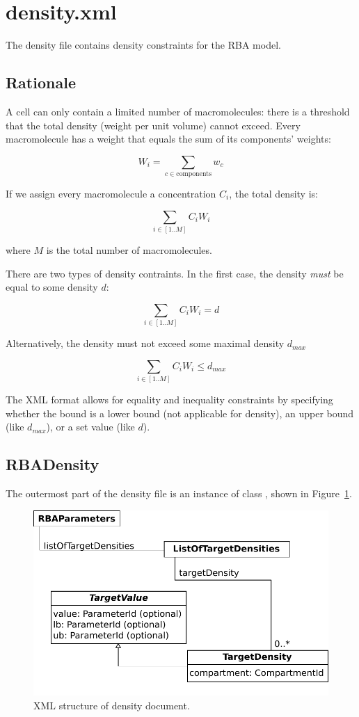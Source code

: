 
\section{density.xml}

The density file contains density constraints for the RBA model.

\subsection{Rationale}

A cell can only contain a limited number of macromolecules:
there is a threshold that the total density
(weight per unit volume) cannot exceed.
Every macromolecule has a weight that equals the sum of its components' weights:

\[
  W_i = \sum_{c \in \mathrm{components}} w_c
\]

If we assign every macromolecule a concentration $C_i$, the total density is:

\[
  \sum_{i \in [1..M]} C_i W_i
\]

where $M$ is the total number of macromolecules.

There are two types of density contraints.
In the first case, the density \emph{must} be equal to some density $d$:

\[
  \sum_{i \in [1..M]} C_i W_i = d
\]

Alternatively, the density must not exceed some maximal density $d_{max}$

\[
  \sum_{i \in [1..M]} C_i W_i \leq d_{max}
\]

The XML format allows for equality and inequality constraints by specifying
whether the bound is a lower bound (not applicable for density),
an upper bound (like $d_{max}$), or a set value (like $d$).

\subsection{RBADensity}
\label{sec:rba_density}

The outermost part of the density file is an instance of class
\rbadensity, shown in Figure~\ref{fig:density_doc}.

\begin{figure}
  \centering
  \includegraphics[scale=0.8]{figures/density_doc}
  \caption{XML structure of density document.}
\label{fig:density_doc}
\end{figure}

